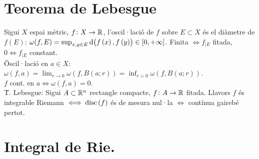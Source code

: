 \section{Teorema de Lebesgue}

\ci Sigui $X$ espai mètric, $f\colon X\to \mathbb{R}$, l'oscil·lació de $f$ sobre $E\subset X$ és el diàmetre de $f(E)$: $\omega(f,E) = \sup_{x,y\in E} \dif \left( f\left( x \right), f\left( y \right) \right) \in \left[ 0, +\infty \right]$. Finita $\iff f_{|E}$ fitada, $0\iff f_{|E}$ constant. \\
\u{Oscil·lació en $a\in X$}: $\omega\left( f,a \right) = \lim_{r\to 0}\omega\left( f, B\left( a;r \right) \right) = \inf_{r>0} \omega\left( f, B\left( a; r \right) \right)$. \\
\ci $f$ cont. en $a \iff \omega\left( f, a \right) = 0$. \\
\u{T. Lebesgue}: Sigui $A\subset \mathbb{R}^n$ rectangle compacte, $f\colon A\to \mathbb{R}$ fitada. Llavors $f$ és integrable Riemann $\iff \operatorname{disc}\left( f \right)$ és de mesura nul·la $\iff$ contínua gairebé pertot.

\section{Integral de Rie.}

